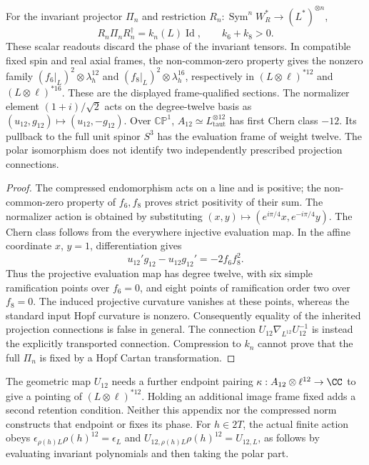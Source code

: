 \documentclass[11pt]{article}
\begin{document}
\begin{proposition}
\label{p1:prop:invariant-compression-connection}
For the invariant projector \(\Pi_n\) and restriction
\(R_n:\operatorname{Sym}^nW_R^*\to (L^*)^{\otimes n}\),
\[
 R_n\Pi_nR_n^\dagger=k_n(L)\operatorname{Id},\qquad k_6+k_8>0.
\]
These scalar readouts discard the phase of the invariant tensors.
In compatible fixed spin and real axial frames, the non-common-zero
property gives the nonzero family
\((f_6|_L)^2\otimes\lambda_h^{12}\) and
\((f_8|_L)^2\otimes\lambda_h^{16}\), respectively in
\((L\otimes\ell)^{*12}\) and \((L\otimes\ell)^{*16}\).
These are the displayed frame-qualified sections.
The normalizer element \((1+i)/\sqrt2\) acts on the degree-twelve basis
as \((u_{12},g_{12})\mapsto(u_{12},-g_{12})\).
Over \(\mathbb{CP}^1\), \(A_{12}\simeq L_{\mathrm{taut}}^{\otimes12}\)
has first Chern class \(-12\).  Its pullback to the full unit spinor
\(S^3\) has the evaluation frame of weight twelve.
The polar isomorphism does not identify two independently prescribed
projection connections.
\end{proposition}
\begin{proof}
The compressed endomorphism acts on a line and is positive; the
non-common-zero property of \(f_6,f_8\) proves strict positivity of their
sum.  The normalizer action is obtained by substituting
\((x,y)\mapsto(e^{i\pi/4}x,e^{-i\pi/4}y)\).
The Chern class follows from the everywhere injective evaluation map.
In the affine coordinate \(x\), \(y=1\), differentiation gives
\[
 u_{12}'g_{12}-u_{12}g_{12}'=-2f_6 f_8^2.
\]
Thus the projective evaluation map has degree twelve, with six simple
ramification points over \(f_6=0\), and eight points of ramification
order two over \(f_8=0\).  The induced projective curvature vanishes at
these points, whereas the standard input Hopf curvature is nonzero.
Consequently equality of the inherited projection connections is false
in general.  The connection
\(U_{12}\nabla_{L^{12}}U_{12}^{-1}\) is instead the explicitly transported
connection.  Compression to \(k_n\) cannot prove that the full
\(\Pi_n\) is fixed by a Hopf Cartan transformation.
\end{proof}

The geometric map \(U_{12}\) needs a further endpoint pairing
\(\kappa:A_{12}\otimes\ell^{12}\to\CC\) to give a pointing of
\((L\otimes\ell)^{*12}\).  Holding an additional image frame fixed
adds a second retention condition.  Neither this appendix nor the
compressed norm constructs that endpoint or fixes its phase.
For \(h\in2T\), the actual finite action obeys
\(\epsilon_{\rho(h)L}\rho(h)^{12}=\epsilon_L\) and
\(U_{12,\rho(h)L}\rho(h)^{12}=U_{12,L}\), as follows by evaluating
invariant polynomials and then taking the polar part.
\end{document}
